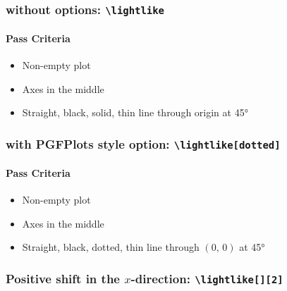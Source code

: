 \documentclass[pagesize,headsepline,parskip=half]{scrartcl}
\begin{document}
        \subsubsection{without options: \texttt{\textbackslash{}lightlike}}
          \begin{spacetimediagram}[grid]
            \lightlike
          \end{spacetimediagram}

          \paragraph{Pass Criteria}
            \begin{itemize}
              \item Non-empty plot
              \item Axes in the middle
              \item Straight, black, solid, thin line through origin at 45°
            \end{itemize}

        \subsubsection{with PGFPlots style option: \texttt{\textbackslash{}lightlike[dotted]}}
          \begin{spacetimediagram}[grid]
            \lightlike[dotted]
          \end{spacetimediagram}

          \paragraph{Pass Criteria}
            \begin{itemize}
              \item Non-empty plot
              \item Axes in the middle
              \item Straight, black, dotted, thin line through $(0, \, 0)$ at 45°
            \end{itemize}

          \subsubsection{Positive shift in the $x$-direction: \texttt{\textbackslash{}lightlike[][2]}}
            \begin{spacetimediagram}
              \lightlike[][2]
            \end{spacetimediagram}
\end{document}
